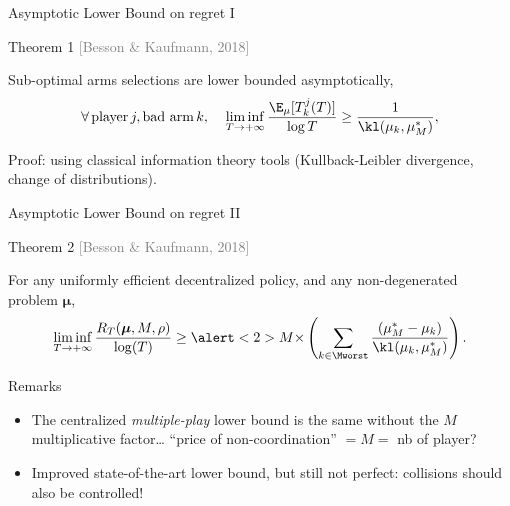 \documentclass[12pt,english,ignorenonframetext,aspectratio=169,]{beamer}
\providecommand{\tightlist}{%
  \setlength{\itemsep}{0pt}\setlength{\parskip}{0pt}}
\begin{document}
\begin{frame}{Asymptotic Lower Bound on regret I}

\begin{block}{Theorem 1
  \hfill{}\textcolor{gray}{[Besson \& Kaufmann, 2018]}}

  Sub-optimal arms selections are lower bounded asymptotically,
  \[\forall\, \text{player}\, j, \text{bad arm}\,k,\;\;\;\; \mathop{\lim\inf}\limits_{T \to +\infty} \frac{\E_{\mu}[T_k^j(T)]}{\log T} \geq \frac{1}{\kl(\mu_k, \mu_M^*)},\]

\end{block}

Proof: using classical information theory tools (Kullback-Leibler divergence, change of distributions).

\end{frame}

\begin{frame}{Asymptotic Lower Bound on regret II}

\begin{block}{Theorem 2
\hfill{}\textcolor{gray}{[Besson \& Kaufmann, 2018]}}

\small{For any uniformly efficient decentralized policy, and any
non-degenerated problem \(\boldsymbol{\mu}\),} \vspace*{-10pt}
\[ \mathop{\lim\inf}\limits_{T \to +\infty} \frac{R_T(\boldsymbol{\mu}, M, \rho)}{\log(T)} \geq
\alert<2>{M \times} \left( \sum_{k \in \Mworst} \frac{(\mu_M^* -  \mu_k)}{\kl(\mu_k, \mu_M^*)} \right) . \]
\end{block}

\pause

\begin{block}{Remarks}

\begin{itemize}
\tightlist
\item
  The centralized \emph{multiple-play} lower bound is the same without
  the \alert{\(M\) multiplicative factor}\ldots{}
  \hook \alert{``price of non-coordination''} \(= M =\) nb of player?
\item
  Improved state-of-the-art lower bound, but still not perfect:
  collisions should also be controlled!
\end{itemize}

\end{block}

\end{frame}
\end{document}
